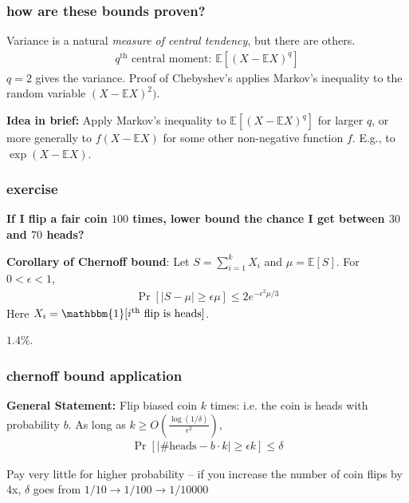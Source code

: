 \documentclass[compress]{beamer}
\newcommand{\E}{\mathbb{E}}
\begin{document}
\begin{frame}
	\frametitle{how are these bounds proven?}
	Variance is a natural \emph{measure of central tendency}, but there are others. 
	\begin{align*}
		q^\text{th} \text{ central moment: } \E[(X-\E X)^q]
	\end{align*}
	$q = 2$ gives the variance. Proof of Chebyshev's applies Markov's inequality to the random variable $(X - \E X)^2)$.
	
	\textbf{Idea in brief:} Apply Markov's inequality to $\E[(X-\E X)^q]$ for larger $q$, or more generally to $f(X-\E X)$ for some other non-negative function $f$. E.g., to $\exp(X-\E X)$. 
\end{frame}

\begin{frame}[t]
	\frametitle{exercise}
	\small 
	\begin{center}
		\textbf{If I flip a fair coin $100$ times, lower bound the chance I get between $30$ and $70$ heads?}
	\end{center}
	
		\textbf{Corollary of Chernoff bound}: Let $S = \sum_{i=1}^k X_i$ and $\mu = \E[S]$. For $0< \epsilon < 1$, 
	\vspace{-.75em}
	\begin{align*}
		\Pr[|S - \mu| \geq \epsilon \mu] \leq 2e^{-\epsilon^2 \mu/3}
	\end{align*} 
	Here $X_i = \mathbbm{1}[i^\text{th} \text{ flip is heads}]$. 
	\vspace{3em}
	
	$1.4\%$.
\end{frame}

\begin{frame}[t]
	\frametitle{chernoff bound application}
	\textbf{General Statement:} Flip biased coin $k$ times: i.e. the coin is heads with probability $b$. As long as $k \geq O\left(\frac{\log(1/\delta)}{\epsilon^2}\right)$,
	\vspace{-.5em}
	\begin{align*}
		\Pr[|\text{\# heads} - b\cdot k| \geq \epsilon k] \leq \delta 
	\end{align*}

	

	\vspace{10em}
		Pay very little for higher probability -- if you increase the number of coin flips by 4x, $\delta$ goes from $1/10 \rightarrow 1/100 \rightarrow 1/10000$
\end{frame}
\end{document}
